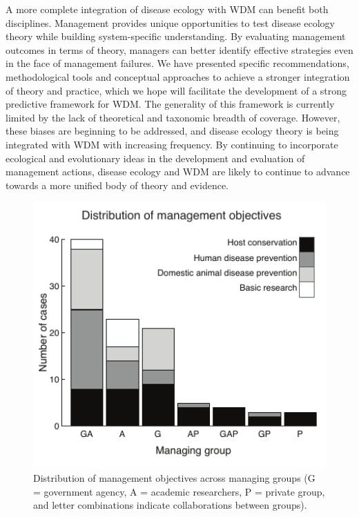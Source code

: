 A more complete integration of disease ecology with WDM can benefit both disciplines.
Management provides unique opportunities to test disease ecology theory while building system-specific understanding.
By evaluating management outcomes in terms of theory, managers can better identify effective strategies even in the face of management failures.
We have presented specific recommendations, methodological tools and conceptual approaches to achieve a stronger integration of theory and practice, which we hope will facilitate the development of a strong predictive framework for WDM.
The generality of this framework is currently limited by the lack of theoretical and taxonomic breadth of coverage.
However, these biases are beginning to be addressed, and disease ecology theory is being integrated with WDM with increasing frequency. By continuing to incorporate ecological and evolutionary ideas in the development and evaluation of management actions, disease ecology and WDM are likely to continue to advance towards a more unified body of theory and evidence.

\begin{figure}
	\caption[Management objectives reported in the wildlife disease management literature]{
	Distribution of management objectives across managing groups (G = government agency, A = academic researchers, P = private group, and letter combinations indicate collaborations between groups).
	}
    \begin{center}
	\includegraphics[width=150mm]{figs/ch1/WDMf1.pdf}
    \end{center}
\label{1-1}
\end{figure}

